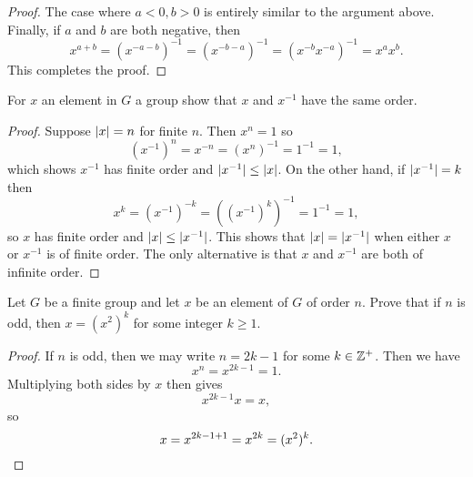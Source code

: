 \begin{enumerate}
\begin{proof}
    The case where $a < 0, b > 0$ is entirely similar to the argument
    above. Finally, if $a$ and $b$ are both negative, then
    \begin{equation*}
      x^{a+b} = (x^{-a-b})^{-1}
      = (x^{-b-a})^{-1}
      = (x^{-b}x^{-a})^{-1}
      = x^ax^b.
    \end{equation*}
    This completes the proof.
  \end{proof}
\end{enumerate}

 For $x$ an element in $G$ a group show that $x$ and
$x^{-1}$ have the same order.
\begin{proof}
  Suppose $\lvert{x}\rvert = n$ for finite $n$. Then $x^n = 1$ so
  \begin{equation*}
    (x^{-1})^n = x^{-n} = (x^n)^{-1} = 1^{-1} = 1,
  \end{equation*}
  which shows $x^{-1}$ has finite order and
  $\lvert{x^{-1}}\rvert \leq \lvert{x}\rvert$. On the other hand, if
  $\lvert{x^{-1}}\rvert = k$ then
  \begin{equation*}
    x^k = (x^{-1})^{-k} = \left((x^{-1})^k\right)^{-1} = 1^{-1} = 1,
  \end{equation*}
  so $x$ has finite order and $\lvert{x}\rvert \leq \lvert{x^{-1}}\rvert$. This shows
  that $\lvert{x}\rvert = \lvert{x^{-1}}\rvert$ when either $x$ or $x^{-1}$ is of
  finite order. The only alternative is that $x$ and $x^{-1}$ are both
  of infinite order.
\end{proof}

 Let $G$ be a finite group and let $x$ be an element of
$G$ of order $n$. Prove that if $n$ is odd, then $x = (x^2)^k$ for
some integer $k\geq1$.
\begin{proof}
  If $n$ is odd, then we may write $n = 2k-1$ for some
  $k\in\mathbb{Z}^+$. Then we have
  \begin{equation*}
    x^n = x^{2k-1} = 1.
  \end{equation*}
  Multiplying both sides by $x$ then gives
  \begin{equation*}
    x^{2k-1}x = x,
  \end{equation*}
  so
  \begin{equation*}
    x = x^{2k-1+1} = x^{2k} = (x^2)^k. \qedhere
  \end{equation*}
\end{proof}

